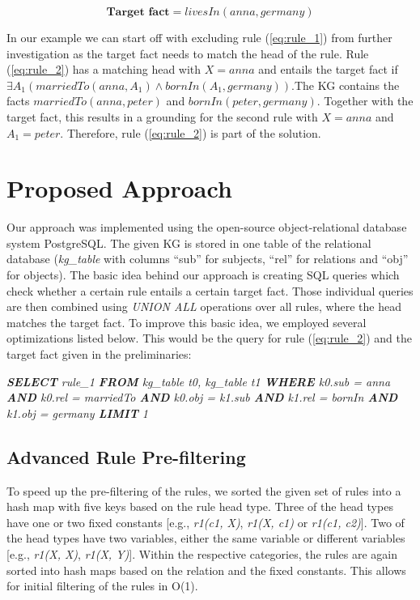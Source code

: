 \documentclass[english]{lni}
\begin{document}
\[\textbf{Target fact} = livesIn(anna, germany)\] 

In our example we can start off with excluding rule (\ref{eq:rule_1}) from further investigation as the target fact needs to match the head of the rule. Rule (\ref{eq:rule_2}) has a matching head with \(X = anna\) and entails the target fact if \(\exists A_1 (marriedTo(anna, A_1) \wedge bornIn(A_1, germany))\).The KG contains the facts \(marriedTo(anna, peter)\) and \(bornIn(peter, germany)\). Together with the target fact, this results in a grounding for the second rule with \(X = anna\) and \(A_1 = peter\). Therefore, rule (\ref{eq:rule_2}) is part of the solution.

\section{Proposed Approach}

Our approach was implemented using the open-source object-relational database system PostgreSQL. The given KG is stored in one table of the relational database (\textit{kg\_table} with columns “sub” for subjects, “rel” for relations and “obj” for objects). The basic idea behind our approach is creating SQL queries which check whether a certain rule entails a certain target fact. Those individual queries are then combined using \textit{UNION ALL} operations over all rules, where the head matches the target fact. To improve this basic idea, we employed several optimizations listed below. This would be the query for rule (\ref{eq:rule_2}) and the target fact given in the preliminaries:

\textit{\textbf{SELECT} rule\_1 \textbf{FROM} kg\_table t0,  kg\_table t1 \textbf{WHERE} k0.sub = anna \textbf{AND} k0.rel = marriedTo \textbf{AND} k0.obj = k1.sub \textbf{AND} k1.rel = bornIn \textbf{AND} k1.obj = germany \textbf{LIMIT} 1}


\subsection{Advanced Rule Pre-filtering} 
To speed up the pre-filtering of the rules, we sorted the given set of rules into a hash map with five keys based on the rule head type. Three of the head types have one or two fixed constants [e.g., \textit{r1(c1, X)}, \textit{r1(X, c1)} or \textit{r1(c1, c2)}]. Two of the head types have two variables, either the same variable or different variables [e.g., \textit{r1(X, X)}, \textit{r1(X, Y)}]. Within the respective categories, the rules are again sorted into hash maps based on the relation and the fixed constants. This allows for initial filtering of the rules in O(1).
\end{document}
